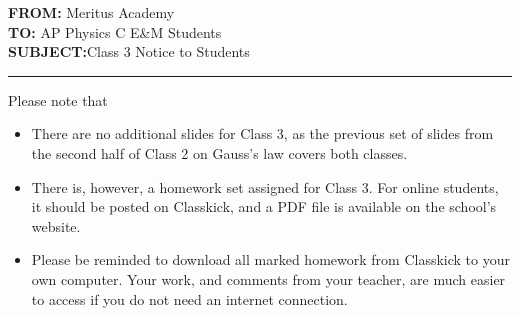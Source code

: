 \documentclass[letterpaper,11pt]{article}
\begin{document}
\textbf{FROM:}\tabto{1.3in} Meritus Academy\\
\textbf{TO:}\tabto{1.3in} AP Physics C E\&M Students\\
\textbf{SUBJECT:}\tabto{1.3in}Class 3 Notice to Students

\vspace{.2in}\hrule

Please note that

\begin{itemize}[itemsep=4pt,topsep=0pt,leftmargin=15pt]
\item There are no additional slides for Class 3, as the previous set of
  slides from the second half of Class 2 on Gauss's law covers both classes.

\item There is, however, a homework set assigned for Class 3. For online
  students, it should be posted on Classkick, and a PDF file is available on
  the school's website.

\item Please be reminded to download all marked homework from Classkick to your
  own computer. Your work, and comments from your teacher, are much easier to
  access if you do not need an internet connection.
\end{itemize}
\end{document}
